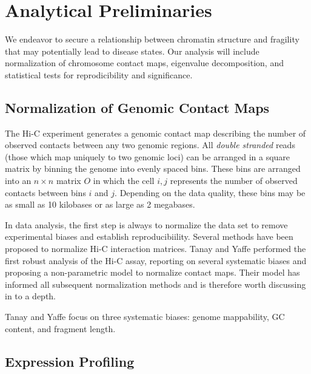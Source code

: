 
\chapter{Analytical Preliminaries}

We endeavor to secure a relationship between chromatin structure and fragility that may potentially lead to disease states.  Our
analysis will include normalization of chromosome contact maps, eigenvalue decomposition, and statistical tests for reprodicibility
and significance.

\section*{Normalization of Genomic Contact Maps}

The Hi-C experiment generates a genomic contact map describing the number of observed contacts between any two genomic
regions.  All \textit{double stranded} reads (those which map uniquely to two genomic loci) can be arranged in a square
matrix by binning the genome into evenly spaced bins.  These bins are arranged into an $n \times n$ matrix $O$ in which the
cell $i,j$ represents the number of observed contacts between bins $i$ and $j$.  Depending on the data quality, these bins
may be as small as 10 kilobases or as large as 2 megabases.

In data analysis, the first step is always to normalize the data set to remove experimental biases and establish reproducibiility.
Several methods have been proposed to normalize Hi-C interaction matrices.  Tanay and Yaffe\cite{tanay2011} performed the first
robust analysis of the Hi-C assay, reporting on several systematic biases and proposing a non-parametric model to normalize contact
maps.  Their model has informed all subsequent normalization methods and is therefore worth discussing in to a depth.

Tanay and Yaffe focus on three systematic biases: genome mappability, GC content, and fragment length.





\section*{Expression Profiling}

